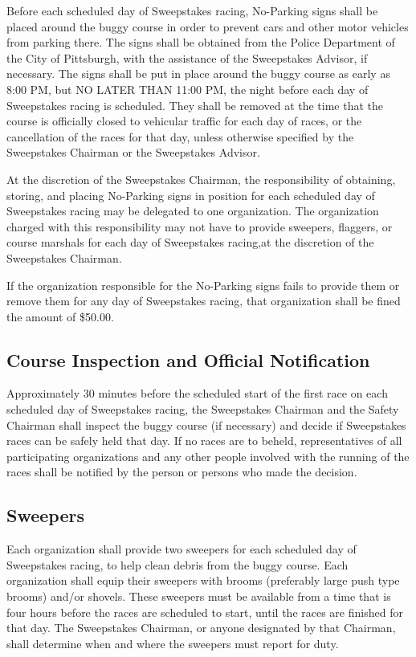 \documentclass[openany]{book}
\begin{document}
Before each scheduled day of Sweepstakes racing, No-Parking signs shall be placed around the buggy course in order to prevent cars and other motor vehicles from parking there. The signs shall be obtained from the Police Department of the City of Pittsburgh, with the assistance of the Sweepstakes Advisor, if necessary. The signs shall be put in place around the buggy course as early as 8:00 PM, but NO LATER THAN 11:00 PM, the night before each day of Sweepstakes racing is scheduled. They shall be removed at the time that the course is officially closed to vehicular traffic for each day of races, or the cancellation of the races for that day, unless otherwise specified by the Sweepstakes Chairman or the Sweepstakes Advisor.

At the discretion of the Sweepstakes Chairman, the responsibility of obtaining, storing, and placing No-Parking signs in position for each scheduled day of Sweepstakes racing may be delegated to one organization. The organization charged with this responsibility may not have to provide sweepers, flaggers, or course marshals for each day of Sweepstakes racing,at the discretion of the Sweepstakes Chairman.

If the organization responsible for the No-Parking signs fails to provide them or remove them for any day of Sweepstakes racing, that organization shall be fined the amount of \$50.00.

\subsection{Course Inspection and Official Notification}

Approximately 30 minutes before the scheduled start of the first race on each scheduled day of Sweepstakes racing, the Sweepstakes Chairman and the Safety Chairman shall inspect the buggy course (if necessary) and decide if Sweepstakes races can be safely held that day. If no races are to beheld, representatives of all participating organizations and any other people involved with the running of the races shall be notified by the person or persons who made the decision.

\subsection{Sweepers}

Each organization shall provide two sweepers for each scheduled day of Sweepstakes racing, to help clean debris from the buggy course. Each organization shall equip their sweepers with brooms (preferably large push type brooms) and/or shovels. These sweepers must be available from a time that is four hours before the races are scheduled to start, until the races are finished for that day. The Sweepstakes Chairman, or anyone designated by that Chairman, shall determine when and where the sweepers must report for duty.
\end{document}
